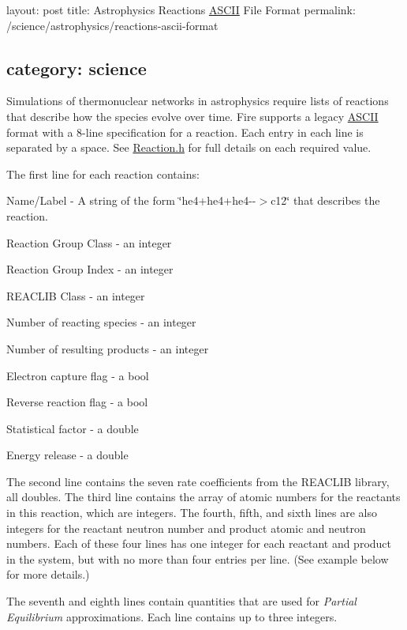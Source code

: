 

 layout\+: post title\+: Astrophysics Reactions \hyperlink{a02172}{A\+S\+C\+II} File Format permalink\+: /science/astrophysics/reactions-\/ascii-\/format \subsection*{category\+: science }

Simulations of thermonuclear networks in astrophysics require lists of reactions that describe how the species evolve over time. Fire supports a legacy \hyperlink{a02172}{A\+S\+C\+II} format with a 8-\/line specification for a reaction. Each entry in each line is separated by a space. See \hyperlink{a00281_source}{Reaction.\+h} for full details on each required value.

The first line for each reaction contains\+:


\begin{DoxyItemize}
\item Name/\+Label -\/ A string of the form \char`\"{}he4+he4+he4-\/-\/$>$c12\char`\"{} that describes the reaction.
\item Reaction Group Class -\/ an integer
\item Reaction Group Index -\/ an integer
\item R\+E\+A\+C\+L\+IB Class -\/ an integer
\item Number of reacting species -\/ an integer
\item Number of resulting products -\/ an integer
\item Electron capture flag -\/ a bool
\item Reverse reaction flag -\/ a bool
\item Statistical factor -\/ a double
\item Energy release -\/ a double
\end{DoxyItemize}

The second line contains the seven rate coefficients from the R\+E\+A\+C\+L\+IB library, all doubles. The third line contains the array of atomic numbers for the reactants in this reaction, which are integers. The fourth, fifth, and sixth lines are also integers for the reactant neutron number and product atomic and neutron numbers. Each of these four lines has one integer for each reactant and product in the system, but with no more than four entries per line. (See example below for more details.)

The seventh and eighth lines contain quantities that are used for {\itshape Partial Equilibrium} approximations. Each line contains up to three integers.


